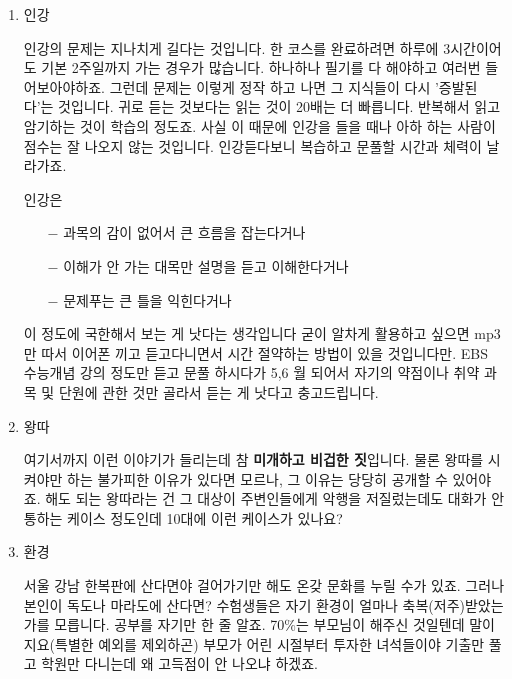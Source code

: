 \begin{enumerate}
    \item 인강
    \vspace{5mm}

    인강의 문제는 지나치게 길다는 것입니다. 한 코스를 완료하려면 하루에 3시간이어도 기본 2주일까지 가는 경우가 많습니다.
    하나하나 필기를 다 해야하고 여러번 들어보아야하죠.
    그런데 문제는 이렇게 정작 하고 나면 그 지식들이 다시 '증발된다'는 것입니다.
    귀로 듣는 것보다는 읽는 것이 20배는 더 빠릅니다. 반복해서 읽고 암기하는 것이 학습의 정도죠.
    사실 이 때문에 인강을 들을 때나 아하 하는 사람이 점수는 잘 나오지 않는 것입니다. 인강듣다보니 복습하고 문풀할 시간과 체력이 날라가죠.
    \vspace{5mm}

    인강은
    \begin{itemize}
        \item[$-$] 과목의 감이 없어서 큰 흐름을 잡는다거나
        \item[$-$] 이해가 안 가는 대목만 설명을 듣고 이해한다거나
        \item[$-$] 문제푸는 큰 틀을 익힌다거나
    \end{itemize}
    이 정도에 국한해서 보는 게 낫다는 생각입니다
    굳이 알차게 활용하고 싶으면 mp3만 따서 이어폰 끼고 듣고다니면서 시간 절약하는 방법이 있을 것입니다만.
    EBS 수능개념 강의 정도만 듣고 문풀 하시다가 5,6 월 되어서 자기의 약점이나 취약 과목 및 단원에 관한 것만 골라서 듣는 게 낫다고 충고드립니다.
    \vspace{5mm}

    \item 왕따
    \vspace{5mm}

    여기서까지 이런 이야기가 들리는데 참 \textbf{미개하고 비겁한 짓}입니다.
    물론 왕따를 시켜야만 하는 불가피한 이유가 있다면 모르나, 그 이유는 당당히 공개할 수 있어야죠.
    해도 되는 왕따라는 건 그 대상이 주변인들에게 악행을 저질렀는데도 대화가 안 통하는 케이스 정도인데 10대에 이런 케이스가 있나요?
    \vspace{5mm}

    \item 환경
    \vspace{5mm}

    서울 강남 한복판에 산다면야 걸어가기만 해도 온갖 문화를 누릴 수가 있죠.
    그러나 본인이 독도나 마라도에 산다면?
    수험생들은 자기 환경이 얼마나 축복(저주)받았는가를 모릅니다.
    공부를 자기만 한 줄 알죠. 70$\%$는 부모님이 해주신 것일텐데 말이지요(특별한 예외를 제외하곤)
    부모가 어린 시절부터 투자한 녀석들이야 기출만 풀고 학원만 다니는데 왜 고득점이 안 나오냐 하겠죠.
    \vspace{5mm}


\end{enumerate}
